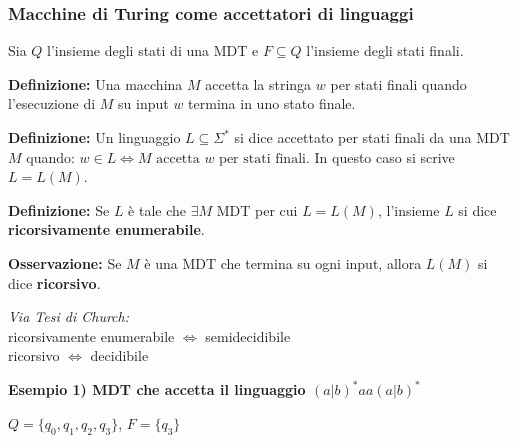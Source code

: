 \vspace{0.6cm}
\subsubsection{Macchine di Turing come accettatori di linguaggi}
Sia $Q$ l'insieme degli stati di una MDT e $F \subseteq Q$ l'insieme degli stati finali.

\vspace{0.4cm}
\textbf{Definizione:} Una macchina $M$ accetta la stringa $w$ per stati finali quando l'esecuzione di $M$ su input $w$ termina in uno stato finale.
\vspace{0.4cm}

\textbf{Definizione:} Un linguaggio $L \subseteq \Sigma^*$ si dice accettato per stati finali da una MDT $M$ quando: $w \in L \iff M \text{ accetta } w \text{ per stati finali}$. In questo caso si scrive $L = L(M)$.

\vspace{0.4cm}
\textbf{Definizione:} Se $L$ è tale che $\exists M$ MDT per cui $L = L(M)$, l'insieme $L$ si dice \textbf{ricorsivamente enumerabile}.

\vspace{0.4cm}
\textbf{Osservazione:} Se $M$ è una MDT che termina su ogni input, allora $L(M)$ si dice \textbf{ricorsivo}.

\vspace{0.4cm}
\textit{Via Tesi di Church:} \\
ricorsivamente enumerabile $\iff$ semidecidibile \\
ricorsivo $\iff$ decidibile

\vspace{1 cm}
\textbf{Esempio 1) MDT che accetta il linguaggio $(a|b)^* aa (a|b)^*$}

\begin{center}
\qquad $Q = \{q_0, q_1, q_2, q_3\}$, \quad $F = \{q_3\}$
\end{center}

